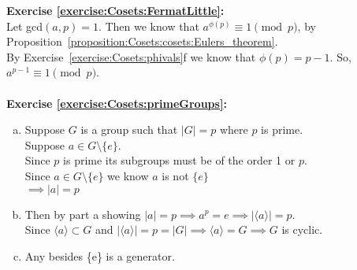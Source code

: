 \noindent\textbf{Exercise \ref{exercise:Cosets:FermatLittle}:}
\\
Let gcd$(a, p) = 1$.  Then we know that $a^{\phi(p)} \equiv 1 \pmod{p}$, by Proposition~\ref{proposition:Cosets:cosets:Eulers_theorem}.
\\
By Exercise~\ref{exercise:Cosets:phivals}f we know that $\phi(p) = p - 1$. So, $a^{p - 1} \equiv 1 \pmod{p}$.
\\
\\

\noindent\textbf{Exercise \ref{exercise:Cosets:primeGroups}:}
\begin{enumerate}[(a)]
\item
Suppose $G$ is a group such that $|G| = p$ where $p$ is prime.
\\
Suppose $a \in G \setminus \{e\}$.
\\
Since $p$ is prime its subgroups must be of the order 1 or $p$.
\\
Since $a \in G \setminus \{e\}$ we know $a$ is not $\{e\}$
\\
$\implies |a| = p$

\item
Then by part a showing $|a| = p \implies a^p = e \implies | \langle a \rangle | = p$.
\\
Since $\langle a \rangle \subset G$ and $| \langle a \rangle | = p = |G| \implies \langle a \rangle = G \implies G$ is cyclic.

\item
Any besides \{e\} is a generator.
\end{enumerate}

